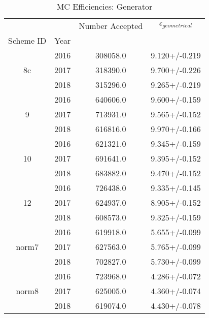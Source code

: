 \begin{table}
\centering
\caption{MC Efficiencies: Generator}
\label{tab:genstrip_2}
\begin{tabular}{cccc}
\toprule
      &      &  Number Accepted & $\epsilon_{geometrical}$ \\
Scheme ID & Year &                  &                          \\
\midrule
\multirow{3}{*}{8c} & 2016 &         308058.0 &            9.120+/-0.219 \\
      & 2017 &         318390.0 &            9.700+/-0.226 \\
      & 2018 &         315296.0 &            9.265+/-0.219 \\
\cline{1-4}
\multirow{3}{*}{9} & 2016 &         640606.0 &            9.600+/-0.159 \\
      & 2017 &         713931.0 &            9.565+/-0.152 \\
      & 2018 &         616816.0 &            9.970+/-0.166 \\
\cline{1-4}
\multirow{3}{*}{10} & 2016 &         621321.0 &            9.345+/-0.159 \\
      & 2017 &         691641.0 &            9.395+/-0.152 \\
      & 2018 &         683882.0 &            9.470+/-0.152 \\
\cline{1-4}
\multirow{3}{*}{12} & 2016 &         726438.0 &            9.335+/-0.145 \\
      & 2017 &         624937.0 &            8.905+/-0.152 \\
      & 2018 &         608573.0 &            9.325+/-0.159 \\
\cline{1-4}
\multirow{3}{*}{norm7} & 2016 &         619918.0 &            5.655+/-0.099 \\
      & 2017 &         627563.0 &            5.765+/-0.099 \\
      & 2018 &         702827.0 &            5.730+/-0.099 \\
\cline{1-4}
\multirow{3}{*}{norm8} & 2016 &         723968.0 &            4.286+/-0.072 \\
      & 2017 &         625005.0 &            4.360+/-0.074 \\
      & 2018 &         619074.0 &            4.430+/-0.078 \\
\bottomrule
\end{tabular}
\end{table}
